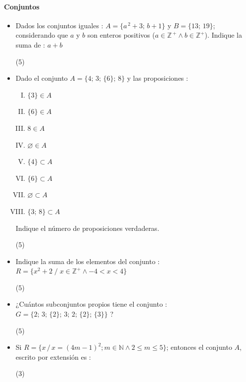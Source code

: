 \documentclass[10pt, twocolumn, landscape, a4paper]{article}
\begin{document}
\paragraph*{Conjuntos}

\begin{itemize}
\item{Dados los conjuntos iguales : $A = \{a^{\,2} + 3;\,b + 1\}$ y $B =\{13;\,19\}$; considerando que $a$ y $b$ son enteros positivos ($a \in \mathbb{Z}^{\,+}\wedge b \in \mathbb{Z}^{+}$). Indique la suma de : $a + b$
\begin{tasks}(5)
\end{tasks}}

\item{Dado el conjunto $A = \{4;\,3;\, \{6\};\,8\}$ y las proposiciones :
\begin{enumerate}[I.]
\item{$\{3\} \in A$} %
\item{$\{6\} \in A$} %
\item{$8 \in A$} %
\item{$\varnothing \in A$} %
\item{$\{4\} \subset A$} %
\item{$\{6\} \subset A$} %
\item{$\varnothing \subset A$} %
\item{$\{3;\,8\} \subset A$} %
\end{enumerate}
Indique el número de proposiciones verdaderas.
\begin{tasks}(5)
\end{tasks}}

\item{Indique la suma de los elementos del conjunto : \\ $R = \{x^2 + 2\;/\;x \in \mathbb{Z}^{+} \wedge -4 < x < 4\}$ %
\begin{tasks}(5)
\end{tasks}}

\item{¿Cuántos subconjuntos propios tiene el conjunto : $G = \{2;\,3;\,\{2\};\,3;\,2;\,\{2\};\,\{3\}\}$ ?
\begin{tasks}(5)
\end{tasks}}

\item{Si $R = \{x\,/\,x = (4m - 1)^{2}; m \in \mathbb{N} \wedge 2 \leq m\leq 5\}$; entonces el conjunto $A$, escrito por extensión es : %
\begin{tasks}(3)
\end{tasks}}

\end{itemize}
\end{document}
